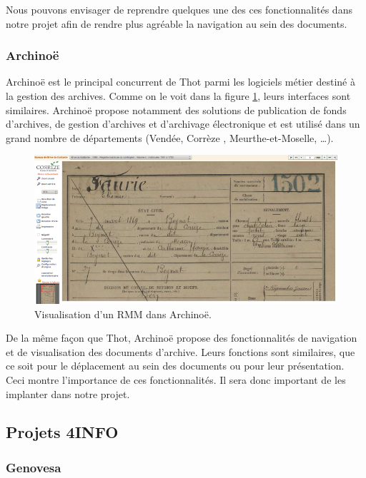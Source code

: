 \documentclass[a4paper]{article}
\begin{document}
	Nous pouvons envisager de reprendre quelques une des ces fonctionnalit\'es dans notre projet afin de rendre plus agr\'eable la navigation au sein des documents.

\subsubsection{Archino\"e}

	Archino\"e est le principal concurrent de Thot parmi les logiciels m\'etier destin\'e \`a la gestion des archives. Comme on le voit dans la figure \ref{fig:archinoe}, leurs interfaces sont similaires. Archino\"e propose notamment des solutions de publication de fonds d'archives, de gestion d'archives et d'archivage \'electronique et est utilis\'e dans un grand nombre de d\'epartements (Vend\'ee, Corr\`eze \cite{archinoe}, Meurthe-et-Moselle, \ldots).

\begin{figure}[H]
\centering
\includegraphics[width=1.0\textwidth]{archinoe.png}
\caption{\label{fig:archinoe}Visualisation d'un RMM dans Archino\"e.}
\end{figure}

	De la m\^eme fa\c{c}on que Thot, Archino\"e propose des fonctionnalit\'es de navigation et de visualisation des documents d'archive.
Leurs fonctions sont similaires, que ce soit pour le d\'eplacement au sein des documents ou pour leur pr\'esentation. Ceci montre l'importance de ces fonctionnalit\'es. Il sera donc important de les implanter dans notre projet.

\subsection{Projets 4INFO}
\label{subsec:projet4info}

\subsubsection{Genovesa}
\end{document}
